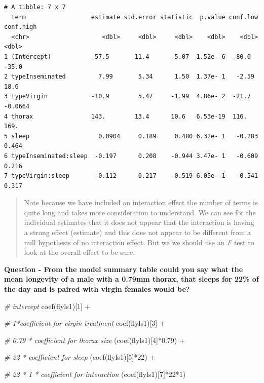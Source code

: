 \documentclass[
]{book}
\newenvironment{Shaded}{\begin{snugshade}}{\end{snugshade}}
\newcommand{\CommentTok}[1]{\textcolor[rgb]{0.56,0.35,0.01}{\textit{#1}}}
\newcommand{\DecValTok}[1]{\textcolor[rgb]{0.00,0.00,0.81}{#1}}
\newcommand{\FloatTok}[1]{\textcolor[rgb]{0.00,0.00,0.81}{#1}}
\newcommand{\FunctionTok}[1]{\textcolor[rgb]{0.00,0.00,0.00}{#1}}
\newcommand{\NormalTok}[1]{#1}
\newcommand{\SpecialCharTok}[1]{\textcolor[rgb]{0.00,0.00,0.00}{#1}}
\begin{document}
\begin{verbatim}
# A tibble: 7 x 7
  term                  estimate std.error statistic  p.value conf.low conf.high
  <chr>                    <dbl>     <dbl>     <dbl>    <dbl>    <dbl>     <dbl>
1 (Intercept)           -57.5       11.4      -5.07  1.52e- 6  -80.0    -35.0   
2 typeInseminated         7.99       5.34      1.50  1.37e- 1   -2.59    18.6   
3 typeVirgin            -10.9        5.47     -1.99  4.86e- 2  -21.7     -0.0664
4 thorax                143.        13.4      10.6   6.53e-19  116.     169.    
5 sleep                   0.0904     0.189     0.480 6.32e- 1   -0.283    0.464 
6 typeInseminated:sleep  -0.197      0.208    -0.944 3.47e- 1   -0.609    0.216 
7 typeVirgin:sleep       -0.112      0.217    -0.519 6.05e- 1   -0.541    0.317 
\end{verbatim}

\begin{quote}
Note because we have included an interaction effect the number of terms is quite long and takes more consideration to understand. We can see for the individual estimates that it does not appear that the interaction is having a strong effect (estimate) and this does not appear to be different from a null hypothesis of no interaction effect. But we we should use an \emph{F} test to look at the overall effect to be sure.
\end{quote}

\textbf{Question - From the model summary table could you say what the mean longevity of a male with a 0.79mm thorax, that sleeps for 22\% of the day and is paired with virgin females would be?}

\begin{Shaded}
\begin{Highlighting}[]
\CommentTok{\# intercept}
\FunctionTok{coef}\NormalTok{(flyls1)[}\DecValTok{1}\NormalTok{] }\SpecialCharTok{+} 
  
\CommentTok{\# 1*coefficient for virgin treatment  }
\FunctionTok{coef}\NormalTok{(flyls1)[}\DecValTok{3}\NormalTok{] }\SpecialCharTok{+} 
  
\CommentTok{\# 0.79 * coefficient for thorax size  }
\NormalTok{(}\FunctionTok{coef}\NormalTok{(flyls1)[}\DecValTok{4}\NormalTok{]}\SpecialCharTok{*}\FloatTok{0.79}\NormalTok{) }\SpecialCharTok{+} 
  
\CommentTok{\# 22 * coefficient for sleep  }
\NormalTok{(}\FunctionTok{coef}\NormalTok{(flyls1)[}\DecValTok{5}\NormalTok{]}\SpecialCharTok{*}\DecValTok{22}\NormalTok{) }\SpecialCharTok{+} 

\CommentTok{\# 22 * 1 * coefficient for interaction}
\NormalTok{(}\FunctionTok{coef}\NormalTok{(flyls1)[}\DecValTok{7}\NormalTok{]}\SpecialCharTok{*}\DecValTok{22}\SpecialCharTok{*}\DecValTok{1}\NormalTok{)}
\end{Highlighting}
\end{Shaded}
\end{document}
